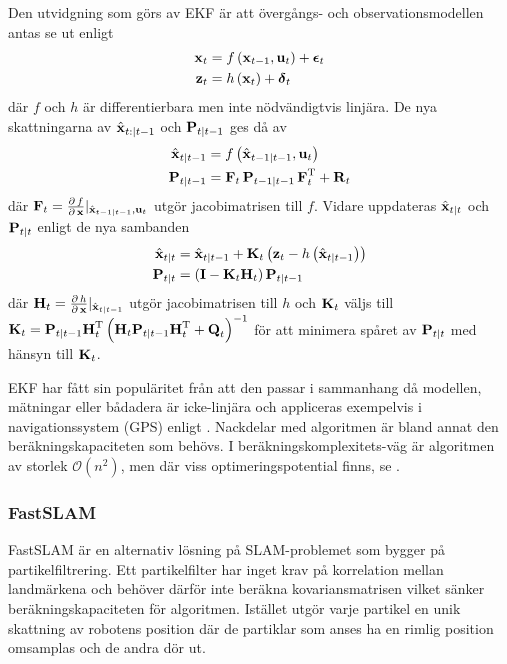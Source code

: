 \documentclass[11pt]{article}
\newcommand{\bfr}[1]{\textbf{\textrm{{#1}}}}
\begin{document}
\begin{flushleft}
Den utvidgning som görs av EKF är att övergångs- och observationsmodellen antas se ut enligt
\begin{align*}
	\bfr{x}_{t} &= f\left(\bfr{x}_{t-1}, \bfr{u}_{t}\right) + \boldsymbol{\epsilon}_{t} \\
	\bfr{z}_{t} &= h\left(\bfr{x}_{t}\right) + \boldsymbol{\delta}
_{t}
\end{align*}
där $f$ och $h$ är differentierbara men inte nödvändigtvis linjära. De nya skattningarna av $\hat{\bfr{x}}_{t:\vert t-1}$ och $\bfr{P}_{t\vert t-1}$ ges då av 
\begin{align*}
	\hat{\bfr{x}}_{t\vert t-1} &= f\left(\hat{\bfr{x}}_{t-1\vert t-1},\bfr{u}_{t}\right) \\
	\bfr{P}_{t\vert t-1} & = \bfr{F}_{t}\,\bfr{P}_{t-1\vert t-1}\,\bfr{F}_{t}^{\mathrm{T}} + \bfr{R}_t
\end{align*}
där $\bfr{F}_{t} = \frac{\partial\,f}{\partial\,\bfr{x}}\rvert_{\hat{\bfr{x}}_{t-1 \vert t-1}, \bfr{u}_{t}}$ utgör jacobimatrisen till $f$. Vidare uppdateras $\hat{\bfr{x}}_{t\vert t}$ och $\bfr{P}_{t\vert t}$ enligt de nya sambanden
\begin{align*}
	\hat{\bfr{x}}_{t\vert t} &= \hat{\bfr{x}}_{t\vert t-1} + \bfr{K}_{t}\left(\bfr{z}_{t} - h\left(\hat{\bfr{x}}_{t\vert t-1}\right)\right) \\
	\bfr{P}_{t\vert t} &= \left(\bfr{I} - \bfr{K}_{t}\bfr{H}_{t}\right)\bfr{P}_{t\vert t-1}	
\end{align*}
där $\bfr{H}_{t} = \frac{\partial\,h}{\partial\,\bfr{x}}\rvert_{\hat{\bfr{x}}_{t\vert t-1}}$ utgör jacobimatrisen till $h$ och $\bfr{K}_{t}$ väljs till $\bfr{K}_{t} = \bfr{P}_{t\vert t-1}\bfr{H}_{t}^{\mathrm{T}}\left(\bfr{H}_{t}\bfr{P}_{t\vert t-1}\bfr{H}_{t}^{\mathrm{T}} + \bfr{Q}_{t}\right)^{-1}$ för att minimera spåret av $\bfr{P}_{t\vert t}$ med hänsyn till $\bfr{K}_{t}$.

EKF har fått sin populäritet från att den passar i sammanhang då modellen, mätningar eller bådadera är icke-linjära och appliceras exempelvis i navigationssystem (GPS) enligt \cite{ekfINaction}. Nackdelar med algoritmen är bland annat den beräkningskapaciteten som behövs. I beräkningskomplexitets-väg är algoritmen av storlek $\mathcal{O}\left(n^{2}\right)$, men där viss optimeringspotential finns, se \cite{ordo}.

\subsubsection{FastSLAM}
FastSLAM är en alternativ lösning på SLAM-problemet som bygger på partikelfiltrering. Ett partikelfilter har inget krav på korrelation mellan landmärkena och behöver därför inte beräkna kovariansmatrisen vilket sänker beräkningskapaciteten för algoritmen. Istället utgör varje partikel en unik skattning av robotens position där de partiklar som anses ha en rimlig position omsamplas och de andra dör ut.


\end{flushleft}
\end{document}
